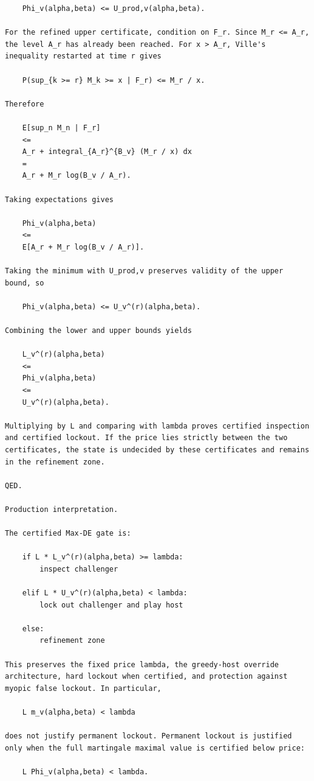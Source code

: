 \begin{small}
\begin{verbatim}
    Phi_v(alpha,beta) <= U_prod,v(alpha,beta).

For the refined upper certificate, condition on F_r. Since M_r <= A_r, the level A_r has already been reached. For x > A_r, Ville's inequality restarted at time r gives

    P(sup_{k >= r} M_k >= x | F_r) <= M_r / x.

Therefore

    E[sup_n M_n | F_r]
    <=
    A_r + integral_{A_r}^{B_v} (M_r / x) dx
    =
    A_r + M_r log(B_v / A_r).

Taking expectations gives

    Phi_v(alpha,beta)
    <=
    E[A_r + M_r log(B_v / A_r)].

Taking the minimum with U_prod,v preserves validity of the upper bound, so

    Phi_v(alpha,beta) <= U_v^(r)(alpha,beta).

Combining the lower and upper bounds yields

    L_v^(r)(alpha,beta)
    <=
    Phi_v(alpha,beta)
    <=
    U_v^(r)(alpha,beta).

Multiplying by L and comparing with lambda proves certified inspection and certified lockout. If the price lies strictly between the two certificates, the state is undecided by these certificates and remains in the refinement zone.

QED.

Production interpretation.

The certified Max-DE gate is:

    if L * L_v^(r)(alpha,beta) >= lambda:
        inspect challenger

    elif L * U_v^(r)(alpha,beta) < lambda:
        lock out challenger and play host

    else:
        refinement zone

This preserves the fixed price lambda, the greedy-host override architecture, hard lockout when certified, and protection against myopic false lockout. In particular,

    L m_v(alpha,beta) < lambda

does not justify permanent lockout. Permanent lockout is justified only when the full martingale maximal value is certified below price:

    L Phi_v(alpha,beta) < lambda.
\end{verbatim}
\end{small}

